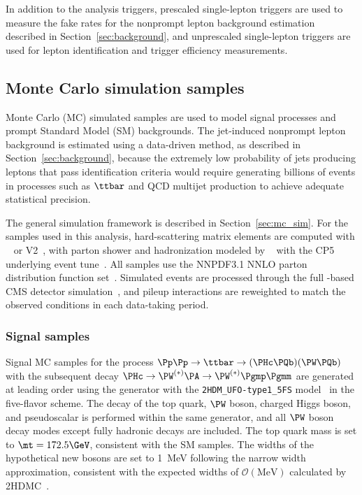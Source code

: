 In addition to the analysis triggers, prescaled single-lepton triggers are used to measure the fake rates for the nonprompt lepton background estimation described in Section~\ref{sec:background}, and unprescaled single-lepton triggers are used for lepton identification and trigger efficiency measurements.

\subsection{Monte Carlo simulation samples}
\label{ssec:mc_samples}

Monte Carlo (MC) simulated samples are used to model signal processes and prompt Standard Model (SM) backgrounds. The jet-induced nonprompt lepton background is estimated using a data-driven method, as described in Section~\ref{sec:background}, because the extremely low probability of jets producing leptons that pass identification criteria would require generating billions of events in processes such as $\ttbar$ and QCD multijet production to achieve adequate statistical precision.

The general simulation framework is described in Section~\ref{sec:mc_sim}. For the samples used in this analysis, hard-scattering matrix elements are computed with \MGvATNLO~\cite{MG5_aMCatNLO} or \POWHEG V2~\cite{Powheg1,Powheg2,Powheg3}, with parton shower and hadronization modeled by ~\cite{Pythia8} with the CP5 underlying event tune~\cite{CPTunes}. All samples use the NNPDF3.1 NNLO parton distribution function set~\cite{NNPDF31}. Simulated events are processed through the full \GEANTfour-based CMS detector simulation~\cite{Geant4}, and pileup interactions are reweighted to match the observed conditions in each data-taking period.

\subsubsection{Signal samples}

Signal MC samples for the process $\Pp\Pp \to \ttbar \to (\PHc\PQb)(\PW\PQb)$ with the subsequent decay $\PHc \to \PW^{(*)}\PA \to \PW^{(*)}\Pgmp\Pgmm$ are generated at leading order using the \MGvATNLO generator with the \texttt{2HDM\_UFO-type1\_5FS} model~\cite{FeynRules2HDM} in the five-flavor scheme. The decay of the top quark, $\PW$ boson, charged Higgs boson, and pseudoscalar is performed within the same generator, and all $\PW$ boson decay modes except fully hadronic decays are included. The top quark mass is set to $\mt = 172.5\GeV$, consistent with the SM samples. The widths of the hypothetical new bosons are set to 1~MeV following the narrow width approximation, consistent with the expected widths of $\mathcal{O}(\text{MeV})$ calculated by \textsc{2HDMC}~\cite{2HDMC}.

